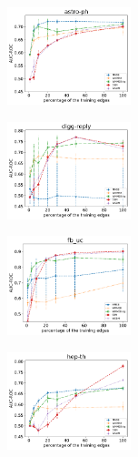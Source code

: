 

\begin{subfigure}
     \centering
         \includegraphics[width=0.32\textwidth]{fig/astro-ph__entropy@_roc_evo}
\end{subfigure}
\begin{subfigure}
         \centering
      \includegraphics[width=0.32\textwidth]{fig/digg-reply__entropy@_roc_evo}               
\end{subfigure}                                                                          
\begin{subfigure}                                                                        
         \centering                                                                      
      \includegraphics[width=0.32\textwidth]{fig/fb_uc__entropy@_roc_evo}
\end{subfigure}                                                                          
\begin{subfigure}                                                                        
         \centering                                                                      
      \includegraphics[width=0.32\textwidth]{fig/hep-th__entropy@_roc_evo}
\end{subfigure}                                                                          
